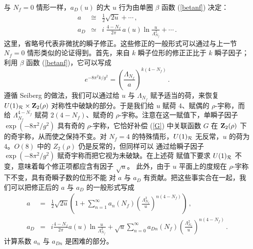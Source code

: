 与 $N_f = 0$ 情形一样，$a_D(u)$ 的大 $u$ 行为由单圈 $\beta$ 函数
(\ref{betanf}) 决定：
\begin{eqnarray}
a &\cong& \frac{1}{2} \sqrt{2u} + \cdots \,,\nonumber\\
a_D &\simeq& i \;\frac{4-N_f}{2\pi}\,a(u)\ln\frac{u}{\Lambda^2_{N_f}}
+ \cdots \,.\label{betanf-mon}
\end{eqnarray}
这里，省略号代表非微扰的瞬子修正。这些修正的一般形式可以通过与上一节
$N_f=0$ 情形类似的论证得到。首先，来自 $k$ 瞬子位形的修正正比于
$k$ 瞬子因子；利用 $\beta$ 函数 (\ref{betanf})，它可以写成
\begin{equation}
e^{-8\pi^2k/g^2} =\left(\frac{\Lambda_{N_f}}{a}\right)^{k(4-N_f)}\,. 
\label{inst-nf}
\end{equation}
遵循 Seiberg \cite{Seiberg-n,Seiberg-poh} 的做法，我们可以通过给 $u$
与 $\Lambda_{N_f}$ 赋予适当的荷，来恢复 $U(1)_{\cal R} \times {\bf Z}_2
(\rho )$ 对称性中破缺的部分。于是我们给 $u$ 赋荷 $4$、赋偶的
$\rho$-宇称，而给 $\Lambda_{N_f}^{4-N_f}$ 赋荷 $2 (4-N_f)$、赋奇的
$\rho$-宇称。注意在这一赋值下，单瞬子因子 $\exp(-8\pi^2/g^2)$ 具有奇的
$\rho$-宇称，它恰好补偿 (\ref{G}) 中关联函数 $G$ 在 ${\bf Z}_2(\rho)$
下的奇宇称，从而使之保持不变。对 $N_f=4$ 的特殊情形，$U(1)_{\cal R}$
无反常，$u$ 的荷为 $4$。$O(8)$ 中的 $Z_2(\rho)$ 仍是反常的，但同样可以
通过给瞬子因子 $\exp(-8\pi^2/g^2)$ 赋奇宇称而把它视为未破缺。在上述荷
赋值下要求 $U(1)_{\cal R}$ 不变，意味着每个修正项都应含有因子 $\sqrt u$。
此外，由于 $u$ 平面上的度规在 $\rho$-宇称下不变，具有奇瞬子数的位形不能
对 $a$ 与 $a_D$ 有贡献。把这些事实合在一起，我们可以把修正后的 $a$ 与
$a_D$ 的一般形式写成
\begin{eqnarray}
a &=& \frac{1}{2} \sqrt{2u} \left ( 1 + \sum_{n=1}^\infty a_n (N_f)
\left(\frac{\Lambda^2_{N_f}}{u}\right)^{n(4-N_f)} \right )\,,
\nonumber\\
a_D &=& i \frac{4-N_f}{2 \pi} a(u) \ln \frac{u}{\Lambda^2_{N_f}} +
\sqrt{u} \sum_{n=0}^\infty  a_{Dn} (N_f) \left(\frac{\Lambda^2_{N_f}}
{u}\right)^{n(4-N_f)} \,.\nonumber
\end{eqnarray}
计算系数 $a_n$ 与 $a_{Dn}$ 是困难的部分。


